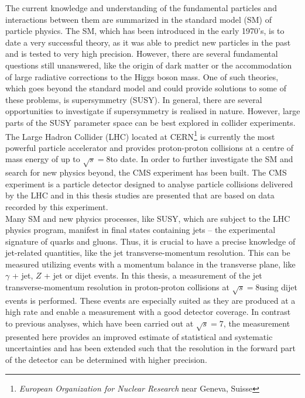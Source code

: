 The current knowledge and understanding of the fundamental particles and interactions between them are summarized in the standard model (SM) of particle physics. The SM, which has been introduced in the early 1970's, is to date a very successful theory, as it was able to predict new particles in the past and is tested to very high precision. However, there are several fundamental questions still unanswered, like the origin of dark matter or the accommodation of large radiative corrections to the Higgs boson mass. One of such theories, which goes beyond the standard model and could provide solutions to some of these problems, is supersymmetry (SUSY). In general, there are several opportunities to investigate if supersymmetry is realised in nature. However, large parts of the SUSY parameter space can be best explored in collider experiments. \\
The Large Hadron Collider (LHC) located at CERN\footnote{\textit{European Organization for Nuclear Research} near Geneva, Suisse} is currently the most powerful particle accelerator and provides proton-proton collisions at a centre of mass energy of up to $\sqrt{s} = 8$\tev to date. In order to further investigate the SM and search for new physics beyond, the CMS experiment has been built. The CMS experiment is a particle detector designed to analyse particle collisions delivered by the LHC and in this thesis studies are presented that are based on data recorded by this experiment. \\ 
Many SM and new physics processes, like SUSY, which are subject to the LHC physics program, manifest in final states containing jets -- the experimental signature of quarks and gluons. Thus, it is crucial to have a precise knowledge of jet-related quantities, like the jet transverse-momentum resolution. This can be measured utilizing events with a momentum balance in the transverse plane, like $\gamma$ + jet, $Z$ + jet or dijet events. In this thesis, a measurement of the jet transverse-momentum resolution in proton-proton collisions at $\sqrt{s} = 8$\tev using dijet events is performed. These events are especially suited as they are produced at a high rate and enable a measurement with a good detector coverage. In contrast to previous analyses, which have been carried out at $\sqrt{s} = 7$\tev, the measurement presented here provides an improved estimate of statistical and systematic uncertainties and has been extended such that the resolution in the forward part of the detector can be determined with higher precision. \\
